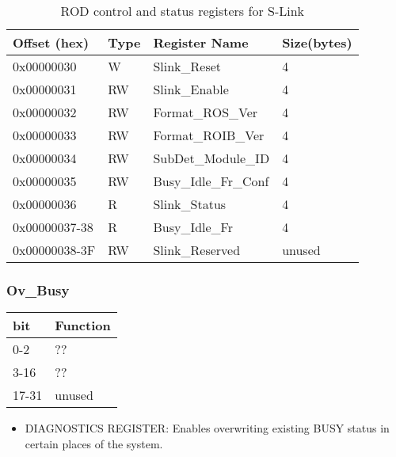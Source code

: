 \begin {table}[H]
\begin{center}
\caption {ROD control and status registers for S-Link}
\label{rod_control_slink}
\begin{tabular}{|l|l|l|l|}
\hline
Offset (hex)& Type & Register Name & Size(bytes)\\
\hline
0x00000030 & W & Slink\_Reset & 4 \\
\hline
0x00000031 & RW & Slink\_Enable & 4 \\
\hline
0x00000032 & RW & Format\_ROS\_Ver & 4 \\
\hline
0x00000033 & RW & Format\_ROIB\_Ver & 4 \\
\hline
0x00000034 & RW & SubDet\_Module\_ID & 4 \\
\hline
0x00000035 & RW & Busy\_Idle\_Fr\_Conf & 4 \\
\hline
0x00000036 & R & Slink\_Status & 4 \\
\hline
0x00000037-38 & R & Busy\_Idle\_Fr & 4 \\
\hline
0x00000038-3F & RW & Slink\_Reserved & unused \\
\hline
\end{tabular}
\end{center}
\end{table}



\subsubsection{Ov\_Busy}

\begin {table}[H]
\begin{center}
\begin{tabular}{|l|l|}
\hline
\textbf{bit} & \textbf{Function} \\
\hline
0-2 & ?? \\
\hline
3-16 & ??  \\
\hline
17-31 & unused \\
\end{tabular}
\end{center}
\end{table}


\begin{itemize}
\item DIAGNOSTICS REGISTER: Enables overwriting existing BUSY status in certain places of the system.
\end{itemize}



